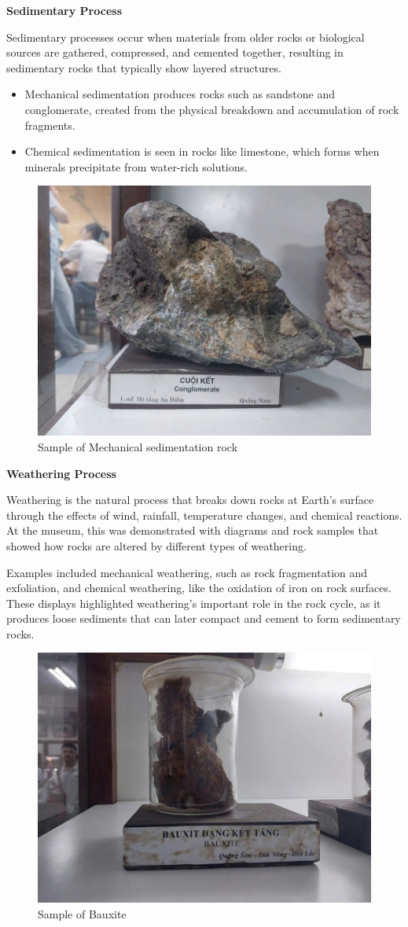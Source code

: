 \textbf{Sedimentary Process}

Sedimentary processes occur when materials from older rocks or biological sources are gathered, compressed, and cemented together, resulting in sedimentary rocks that typically show layered structures.

\begin{itemize}
  \item Mechanical sedimentation produces rocks such as sandstone and conglomerate, created from the physical breakdown and accumulation of rock fragments.
  \item Chemical sedimentation is seen in rocks like limestone, which forms when minerals precipitate from water-rich solutions.
\end{itemize}

\begin{figure}[H]
  \centering
  \includegraphics[max width=0.8\linewidth]{graphics/figure_09.jpg}
  \caption{Sample of Mechanical sedimentation rock}
  \label{fig:mechanical-sedimentation}
\end{figure}

\textbf{Weathering Process}

Weathering is the natural process that breaks down rocks at Earth's surface through the effects of wind, rainfall, temperature changes, and chemical reactions. At the museum, this was demonstrated with diagrams and rock samples that showed how rocks are altered by different types of weathering.

Examples included mechanical weathering, such as rock fragmentation and exfoliation, and chemical weathering, like the oxidation of iron on rock surfaces. These displays highlighted weathering's important role in the rock cycle, as it produces loose sediments that can later compact and cement to form sedimentary rocks.

\begin{figure}[H]
  \centering
  \includegraphics[max width=0.8\linewidth]{graphics/figure_10.jpg}
\caption{Sample of Bauxite}
\label{fig:bauxite}
\end{figure}